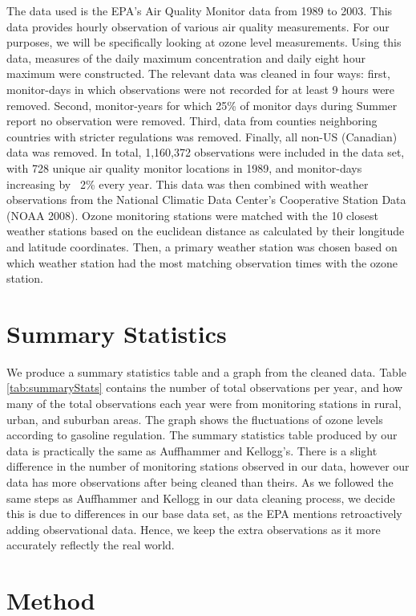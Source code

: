 \documentclass{article}
\begin{document}
The data used is the EPA’s Air Quality Monitor data from 1989 to 2003. This data provides hourly observation of various air quality measurements. For our purposes, we will be specifically looking at ozone level measurements. Using this data, measures of the daily maximum concentration and daily eight hour maximum were constructed. The relevant data was cleaned in four ways: first, monitor-days in which observations were not recorded for at least 9 hours were removed. Second, monitor-years for which 25\% of monitor days during Summer report no observation were removed. Third, data from counties neighboring countries with stricter regulations was removed. Finally, all non-US (Canadian) data was removed. In total, 1,160,372 observations were included in the data set, with 728 unique air quality monitor locations in 1989, and monitor-days increasing by ~2\% every year. This data was then combined with weather observations from the National Climatic Data Center’s Cooperative Station Data (NOAA 2008). Ozone monitoring stations were matched with the 10 closest weather stations based on the euclidean distance as calculated by their longitude and latitude coordinates. Then, a primary weather station was chosen based on which weather station had the most matching observation times with the ozone station. 

\section{Summary Statistics}

We produce a summary statistics table and a graph from the cleaned data. Table  \ref{tab:summaryStats} contains the number of total observations per year, and how many of the total observations each year were from monitoring stations in rural, urban, and suburban areas. The graph shows the fluctuations of ozone levels according to gasoline regulation. The summary statistics table produced by our data is practically the same as Auffhammer and Kellogg’s. There is a slight difference in the number of monitoring stations observed in our data, however our data has more observations after being cleaned than theirs. As we followed the same steps as Auffhammer and Kellogg in our data cleaning process, we decide this is due to differences in our base data set, as the EPA mentions retroactively adding observational data. Hence, we keep the extra observations as it more accurately reflectly the real world.  


\section{Method}
\end{document}
